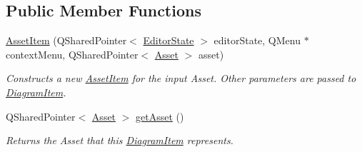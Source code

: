 \subsection*{Public Member Functions}
\begin{DoxyCompactItemize}
\item 
\hypertarget{class_asset_item_a3a906a41b88bfa28ba3ac56c66004713}{\hyperlink{class_asset_item_a3a906a41b88bfa28ba3ac56c66004713}{Asset\-Item} (Q\-Shared\-Pointer$<$ \hyperlink{class_editor_state}{Editor\-State} $>$ editor\-State, Q\-Menu $\ast$context\-Menu, Q\-Shared\-Pointer$<$ \hyperlink{class_picto_1_1_asset}{Asset} $>$ asset)}\label{class_asset_item_a3a906a41b88bfa28ba3ac56c66004713}

\begin{DoxyCompactList}\small\item\em Constructs a new \hyperlink{class_asset_item}{Asset\-Item} for the input Asset. Other parameters are passed to \hyperlink{class_diagram_item}{Diagram\-Item}. \end{DoxyCompactList}\item 
\hypertarget{class_asset_item_a186efcf7b26bc95a175bb69010774efe}{Q\-Shared\-Pointer$<$ \hyperlink{class_picto_1_1_asset}{Asset} $>$ \hyperlink{class_asset_item_a186efcf7b26bc95a175bb69010774efe}{get\-Asset} ()}\label{class_asset_item_a186efcf7b26bc95a175bb69010774efe}

\begin{DoxyCompactList}\small\item\em Returns the Asset that this \hyperlink{class_diagram_item}{Diagram\-Item} represents. \end{DoxyCompactList}\end{DoxyCompactItemize}

